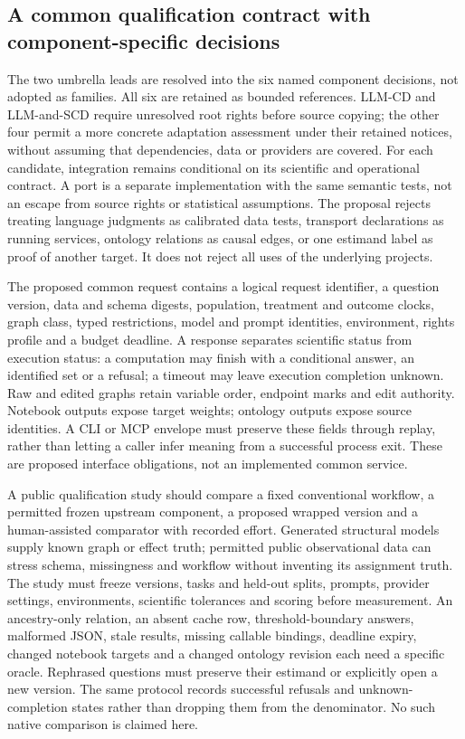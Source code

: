 \subsection{A common qualification contract with component-specific decisions}
The two umbrella leads are resolved into the six named component decisions,
not adopted as families. All six are retained as bounded references. LLM-CD
and LLM-and-SCD require unresolved root rights before source copying; the
other four permit a more concrete adaptation assessment under their retained
notices, without assuming that dependencies, data or providers are covered.
For each candidate, integration remains conditional on its scientific and
operational contract. A port is a separate implementation with the same
semantic tests, not an escape from source rights or statistical assumptions.
The proposal rejects treating language judgments as calibrated data tests,
transport declarations as running services, ontology relations as causal
edges, or one estimand label as proof of another target. It does not reject
all uses of the underlying projects.\citep{exec25_agents_choice}

The proposed common request contains a logical request identifier, a question
version, data and schema digests, population, treatment and outcome clocks,
graph class, typed restrictions, model and prompt identities, environment,
rights profile and a budget deadline. A response separates scientific status
from execution status: a computation may finish with a conditional answer,
an identified set or a refusal; a timeout may leave execution completion
unknown. Raw and edited graphs retain variable order, endpoint marks and edit
authority. Notebook outputs expose target weights; ontology outputs expose
source identities. A CLI or MCP envelope must preserve these fields through
replay, rather than letting a caller infer meaning from a successful process
exit. These are proposed interface obligations, not an implemented common
service.\citep{exec25_agents_choice}

A public qualification study should compare a fixed conventional workflow,
a permitted frozen upstream component, a proposed wrapped version and a
human-assisted comparator with recorded effort. Generated structural models
supply known graph or effect truth; permitted public observational data can
stress schema, missingness and workflow without inventing its assignment
truth. The study must freeze versions, tasks and held-out splits, prompts,
provider settings, environments, scientific tolerances and scoring before
measurement. An ancestry-only relation, an absent cache row, threshold-boundary
answers, malformed JSON, stale results, missing callable bindings, deadline
expiry, changed notebook targets and a changed ontology revision each need a
specific oracle. Rephrased questions must preserve their estimand or explicitly
open a new version. The same protocol records successful refusals and
unknown-completion states rather than dropping them from the denominator.
No such native comparison is claimed here.\citep{exec25_agents_choice}

